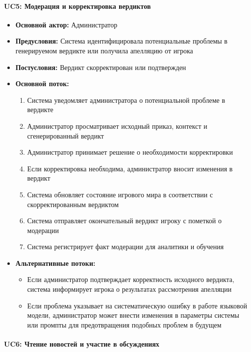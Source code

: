 \paragraph{UC5: Модерация и корректировка вердиктов}

\begin{itemize}
    \item \textbf{Основной актор:} Администратор
    \item \textbf{Предусловия:} Система идентифицировала потенциальные проблемы в генерируемом вердикте или получила апелляцию от игрока
    \item \textbf{Постусловия:} Вердикт скорректирован или подтвержден
    \item \textbf{Основной поток:}
    \begin{enumerate}
        \item Система уведомляет администратора о потенциальной проблеме в вердикте
        \item Администратор просматривает исходный приказ, контекст и сгенерированный вердикт
        \item Администратор принимает решение о необходимости корректировки
        \item Если корректировка необходима, администратор вносит изменения в вердикт
        \item Система обновляет состояние игрового мира в соответствии с скорректированным вердиктом
        \item Система отправляет окончательный вердикт игроку с пометкой о модерации
        \item Система регистрирует факт модерации для аналитики и обучения
    \end{enumerate}
    \item \textbf{Альтернативные потоки:}
    \begin{itemize}
        \item Если администратор подтверждает корректность исходного вердикта, система информирует игрока о результатах рассмотрения апелляции
        \item Если проблема указывает на систематическую ошибку в работе языковой модели, администратор может внести изменения в параметры системы или промпты для предотвращения подобных проблем в будущем
    \end{itemize}
\end{itemize}

\paragraph{UC6: Чтение новостей и участие в обсуждениях}

